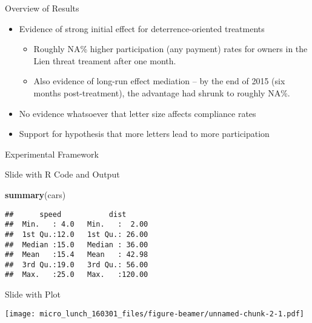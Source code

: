 \documentclass[ignorenonframetext,]{beamer}
\newenvironment{Shaded}{\begin{snugshade}}{\end{snugshade}}
\newcommand{\KeywordTok}[1]{\textcolor[rgb]{0.13,0.29,0.53}{\textbf{{#1}}}}
\newcommand{\NormalTok}[1]{{#1}}
\begin{document}
\begin{frame}{Overview of Results}

\begin{itemize}
\item
  Evidence of strong initial effect for deterrence-oriented treatments

  \begin{itemize}
  \item
    Roughly NA\% higher participation (any payment) rates for owners in
    the Lien threat treament after one month.
  \item
    Also evidence of long-run effect mediation -- by the end of 2015
    (six months post-treatment), the advantage had shrunk to roughly
    NA\%.
  \end{itemize}
\item
  No evidence whatsoever that letter size affects compliance rates
\item
  Support for hypothesis that more letters lead to more participation
\end{itemize}

\end{frame}

\begin{frame}{Experimental Framework}

\end{frame}

\begin{frame}[fragile]{Slide with R Code and Output}

\begin{Shaded}
\begin{Highlighting}[]
\KeywordTok{summary}\NormalTok{(cars)}
\end{Highlighting}
\end{Shaded}

\begin{verbatim}
##      speed           dist       
##  Min.   : 4.0   Min.   :  2.00  
##  1st Qu.:12.0   1st Qu.: 26.00  
##  Median :15.0   Median : 36.00  
##  Mean   :15.4   Mean   : 42.98  
##  3rd Qu.:19.0   3rd Qu.: 56.00  
##  Max.   :25.0   Max.   :120.00
\end{verbatim}

\end{frame}

\begin{frame}{Slide with Plot}

\texttt{[image: micro\_lunch\_160301\_files/figure-beamer/unnamed-chunk-2-1.pdf]}

\end{frame}
\end{document}
